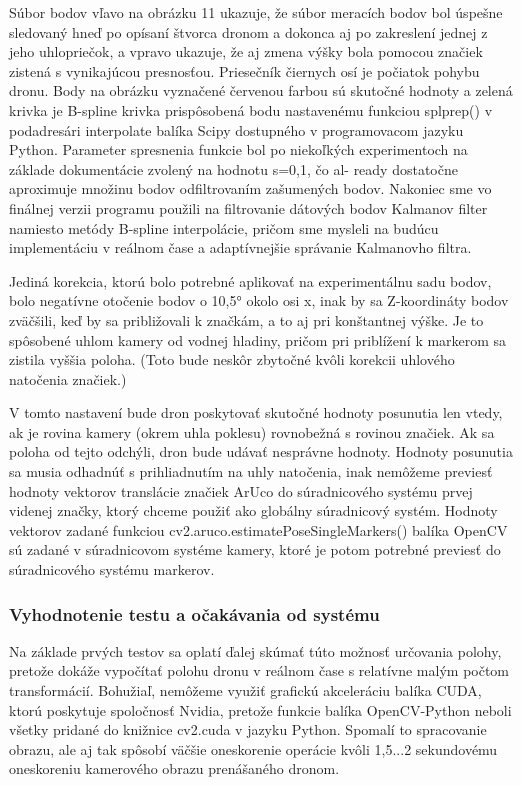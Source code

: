 {Súbor bodov vľavo na obrázku 11 ukazuje, že súbor meracích bodov bol úspešne sledovaný hneď po opísaní štvorca dronom a dokonca aj po zakreslení jednej z jeho uhlopriečok, a vpravo ukazuje, že aj zmena výšky bola pomocou značiek zistená s vynikajúcou presnosťou. Priesečník čiernych osí je počiatok pohybu dronu. Body na obrázku vyznačené červenou farbou sú skutočné hodnoty a zelená krivka je B-spline krivka prispôsobená bodu nastavenému funkciou splprep() v podadresári interpolate balíka Scipy dostupného v programovacom jazyku Python. Parameter spresnenia funkcie bol po niekoľkých experimentoch na základe dokumentácie \citep{scipy-docs} zvolený na hodnotu s=0,1, čo al- ready dostatočne aproximuje množinu bodov odfiltrovaním zašumených bodov. Nakoniec sme vo finálnej verzii programu použili na filtrovanie dátových bodov Kalmanov filter namiesto metódy B-spline interpolácie, pričom sme mysleli na budúcu implementáciu v reálnom čase a adaptívnejšie správanie Kalmanovho filtra. 

Jediná korekcia, ktorú bolo potrebné aplikovať na experimentálnu sadu bodov, bolo negatívne otočenie bodov o 10,5° okolo osi x, inak by sa Z-koordináty bodov zväčšili, keď by sa približovali k značkám, a to aj pri konštantnej výške. Je to spôsobené uhlom kamery od vodnej hladiny, pričom pri priblížení k markerom sa zistila vyššia poloha. (Toto bude neskôr zbytočné kvôli korekcii uhlového natočenia značiek.)

V tomto nastavení bude dron poskytovať skutočné hodnoty posunutia len vtedy, ak je rovina kamery (okrem uhla poklesu) rovnobežná s rovinou značiek. Ak sa poloha od tejto odchýli, dron bude udávať nesprávne hodnoty. Hodnoty posunutia sa musia odhadnúť s prihliadnutím na uhly natočenia, inak nemôžeme previesť hodnoty vektorov translácie značiek ArUco do súradnicového systému prvej videnej značky, ktorý chceme použiť ako globálny súradnicový systém.  Hodnoty vektorov zadané funkciou cv2.aruco.estimatePoseSingleMarkers() balíka OpenCV sú zadané v súradnicovom systéme kamery, ktoré je potom potrebné previesť do súradnicového systému markerov. 

\subsubsection{Vyhodnotenie testu a očakávania od systému}
Na základe prvých testov sa oplatí ďalej skúmať túto možnosť určovania polohy, pretože dokáže vypočítať polohu dronu v reálnom čase s relatívne malým počtom transformácií. Bohužiaľ, nemôžeme využiť grafickú akceleráciu balíka CUDA, ktorú poskytuje spoločnosť Nvidia, pretože funkcie balíka OpenCV-Python neboli všetky pridané do knižnice cv2.cuda v jazyku Python. Spomalí to spracovanie obrazu, ale aj tak spôsobí väčšie oneskorenie operácie kvôli 1,5...2 sekundovému oneskoreniu kamerového obrazu prenášaného dronom. 

}
